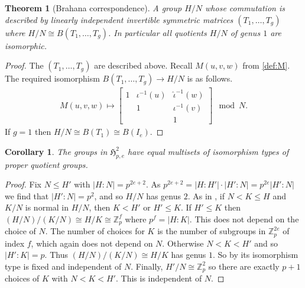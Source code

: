 \documentclass{toc}
\numberwithin{equation}{section}
\theoremstyle{plain}       %
\newtheorem{thm}[equation]{Theorem}
\newtheorem{coro}[equation]{Corollary}
\theoremstyle{remark}
\theoremstyle{definition}
\numberwithin{figure}{section}
\numberwithin{table}{section}
\newcommand{\mygroups}{\mathfrak{H}}
\begin{document}
\begin{thm}[Brahana correspondence]\label{thm:Brahana}
	A group $H/N$ whose commutation is described by linearly independent
	invertible symmetric matrices $(T_1,\dots,T_g)$ where $H/N\cong
	B(T_1,\dots,T_g)$. In particular all quotients $H/N$ of genus $1$ are
	isomorphic.
\end{thm}
\begin{proof}
	The $(T_1,\ldots,T_g)$ are described above.  Recall $M(u,v,w)$ from
	\eqref{def:M}. The required isomorphism $B(T_1,\dots,T_g)\to H/N$ is as
	follows.
\begin{align*}
		M(u,v,w)
	\mapsto
	\begin{bmatrix}
		1 & \iota^{-1}(u) & \hat{\iota}^{-1}(w) \\ & 1 & \iota^{-1}(v)\\ & & 1
	\end{bmatrix}
	\mod{N}.		
\end{align*}
If $g=1$ then $H/N\cong B(T_1)\cong B(I_e)$.  
\end{proof}

\begin{coro}\label{coro:quo-profile}
	The groups in $\mygroups_{p,e}^{2}$ have equal multisets of isomorphism
	types of proper quotient groups.
\end{coro}
\begin{proof}
Fix $N\leq H'$ with $|H:N|=p^{2e+2}$.  As $p^{2e+2}=|H:H'|\cdot
|H':N|=p^{2e}|H':N|$ we find that $|H':N|=p^2$, and so $H/N$ has genus $2$.  As
in , if $N< K\leq H$ and $K/N$ is normal in $H/N$, then
$K<H'$ or $H'\leq K$.  If $H'\leq K$ then $(H/N)/(K/N)\cong H/K\cong
\mathbb{Z}_p^f$ where $p^f=|H:K|$.  This does not depend on the choice of $N$.
The number of choices for $K$ is the number of subgroups in $\mathbb{Z}_p^{2e}$
of index $f$, which again does not depend on $N$.  Otherwise $N<K<H'$ and so
$|H':K|=p$.  Thus $(H/N)/(K/N)\cong H/K$ has genus $1$.  So by
 its isomorphism type is  fixed and independent of $N$.
Finally, $H'/N\cong \mathbb{Z}_p^2$ so there are exactly $p+1$ choices of $K$
with $N<K<H'$.  This is independent of $N$.
\end{proof}
\end{document}
